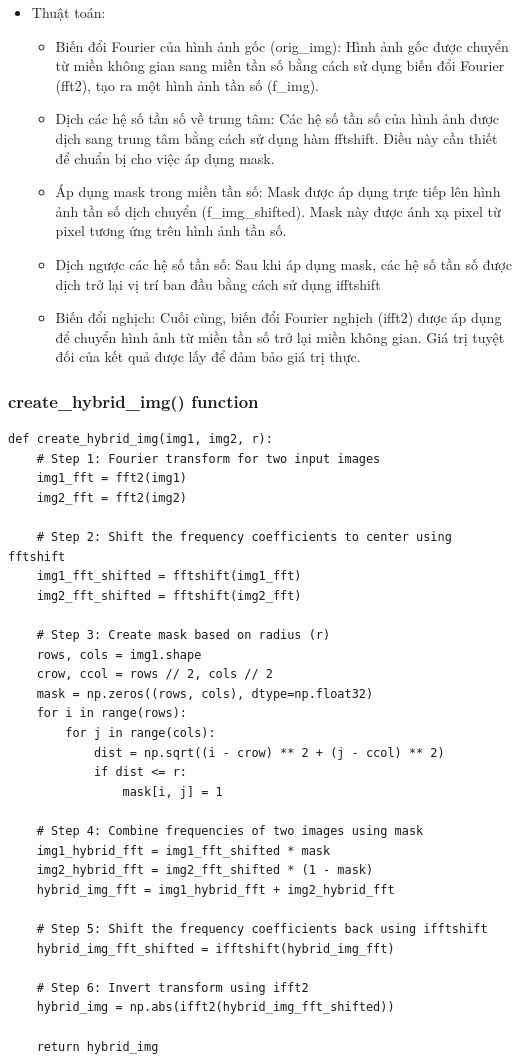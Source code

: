 \documentclass{article}
\begin{document}
\begin{itemize}
    
    \item Thuật toán:
    \begin{itemize}
        \item Biến đổi Fourier của hình ảnh gốc (orig\_img): Hình ảnh gốc được chuyển từ miền không gian sang miền tần số bằng cách sử dụng biến đổi Fourier (fft2), tạo ra một hình ảnh tần số (f\_img).
        \item Dịch các hệ số tần số về trung tâm: Các hệ số tần số của hình ảnh được dịch sang trung tâm bằng cách sử dụng hàm fftshift. Điều này cần thiết để chuẩn bị cho việc áp dụng mask.
        \item Áp dụng mask trong miền tần số: Mask được áp dụng trực tiếp lên hình ảnh tần số dịch chuyển (f\_img\_shifted). Mask này được ánh xạ pixel từ pixel tương ứng trên hình ảnh tần số.
        \item Dịch ngược các hệ số tần số: Sau khi áp dụng mask, các hệ số tần số được dịch trở lại vị trí ban đầu bằng cách sử dụng ifftshift
        \item Biến đổi nghịch: Cuối cùng, biến đổi Fourier nghịch (ifft2) được áp dụng để chuyển hình ảnh từ miền tần số trở lại miền không gian. Giá trị tuyệt đối của kết quả được lấy để đảm bảo giá trị thực.
    \end{itemize}
\end{itemize}


\subsubsection{create\_hybrid\_img() function}
\begin{lstlisting}[caption={Code of reate\_hybrid\_img() function}, label={reate\_hybrid\_img()}]
def create_hybrid_img(img1, img2, r):
    # Step 1: Fourier transform for two input images
    img1_fft = fft2(img1)
    img2_fft = fft2(img2)

    # Step 2: Shift the frequency coefficients to center using fftshift
    img1_fft_shifted = fftshift(img1_fft)
    img2_fft_shifted = fftshift(img2_fft)

    # Step 3: Create mask based on radius (r)
    rows, cols = img1.shape
    crow, ccol = rows // 2, cols // 2
    mask = np.zeros((rows, cols), dtype=np.float32)
    for i in range(rows):
        for j in range(cols):
            dist = np.sqrt((i - crow) ** 2 + (j - ccol) ** 2)
            if dist <= r:
                mask[i, j] = 1

    # Step 4: Combine frequencies of two images using mask
    img1_hybrid_fft = img1_fft_shifted * mask
    img2_hybrid_fft = img2_fft_shifted * (1 - mask)
    hybrid_img_fft = img1_hybrid_fft + img2_hybrid_fft

    # Step 5: Shift the frequency coefficients back using ifftshift
    hybrid_img_fft_shifted = ifftshift(hybrid_img_fft)

    # Step 6: Invert transform using ifft2
    hybrid_img = np.abs(ifft2(hybrid_img_fft_shifted))

    return hybrid_img
\end{lstlisting}
\end{document}
